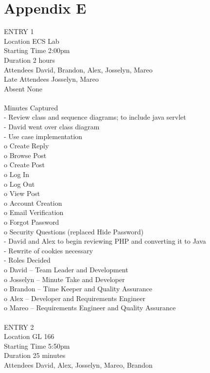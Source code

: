 \documentclass{report}
\begin{document}
\section{Appendix E}
ENTRY 1\\	
Location		ECS Lab\\
Starting Time		2:00pm\\
Duration		2 hours\\
Attendees		David, Brandon, Alex, Josselyn, Mareo\\
Late Attendees	Josselyn, Mareo\\
Absent		None\\
\\
Minutes Captured\\
-	Review class and sequence diagrams; to include java servlet\\
-	David went over class diagram\\
-	Use case implementation\\
o	Create Reply\\
o	Browse Post\\
o	Create Post\\
o	Log In\\
o	Log Out\\
o	View Post\\
o	Account Creation\\
o	Email Verification\\
o	Forgot Password\\
o	Security Questions (replaced Hide Password)\\
-	David and Alex to begin reviewing PHP and converting it to Java\\
-	Rewrite of cookies necessary\\
-	Roles Decided\\
o	David – Team Leader and Development\\
o	Josselyn – Minute Take and Developer\\
o	Brandon – Time Keeper and Quality Assurance\\
o	Alex – Developer and Requirements Engineer\\
o	Mareo – Requirements Engineer and Quality Assurance\\
\\
ENTRY 2\\	
Location		GL 166\\
Starting Time		5:50pm\\
Duration		25 minutes\\
Attendees		David, Alex, Josselyn, Mareo, Brandon\\
\end{document}
